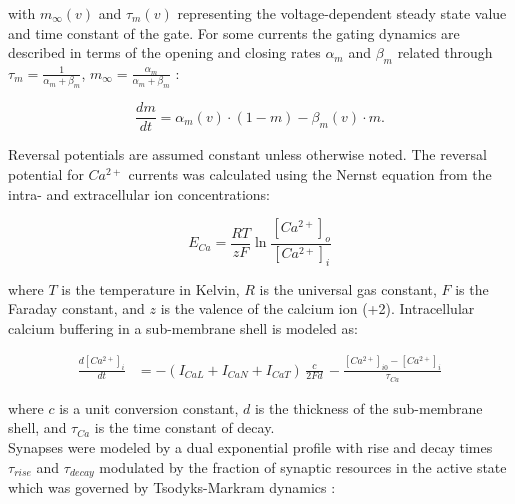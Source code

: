 with $ m_{ \infty } (v) $ and $\tau_{ m } (v)$ representing the voltage-dependent steady state value and time constant of the gate. For some currents the gating dynamics are described in terms of the opening and closing rates $\alpha_m$ and $\beta_m$ related through $ \tau_{ m } = \frac{1}{ \alpha_m + \beta_m } $, $ m_{ \infty } = \frac{ \alpha_m }{ \alpha_m + \beta_m }$ :

\begin{equation}
    \frac{dm}{dt} = \alpha_m (v) \cdot (1 - m) - \beta_m (v) \cdot m .
\end{equation}

Reversal potentials are assumed constant unless otherwise noted. The reversal potential for $  Ca  ^ { 2 + } $ currents was calculated using the Nernst equation from the intra- and extracellular ion concentrations:

\begin{equation}
    E_{Ca} = \frac{RT}{zF} \ln { \frac{ \left[  Ca  ^ { 2 + } \right] _ { o }  }{ \left[  Ca  ^ { 2 + } \right] _ { i }  } }
\end{equation}

where $T$ is the temperature in Kelvin, $R$ is the universal gas constant, $F$ is the Faraday constant, and $z$ is the valence of the calcium ion (+2). Intracellular calcium buffering in a sub-membrane shell is modeled as:

\begin{align}
    \frac { d \left[  Ca ^ { 2 + } \right] _ { i } }{ dt } &= - \left( I_{CaL} + I_{CaN} + I_{CaT} \right) \, \frac{c}{2 F d} \, - \frac{ \left[ Ca^{2+} \right] _ { i0 } - \left[Ca^ { 2 + } \right] _ { i } }{ \tau _ {Ca} }
\end{align}

where $c$ is a unit conversion constant, $d$ is the thickness of the sub-membrane shell, and $ \tau _ {  Ca  } $ is the time constant of decay. \\

%
%

Synapses were modeled by a dual exponential profile with rise and decay times $\tau_{rise}$ and $\tau_{decay}$ modulated by the fraction of synaptic resources in the active state which was governed by Tsodyks-Markram dynamics \cite{tsodyks_neural_1998}:

